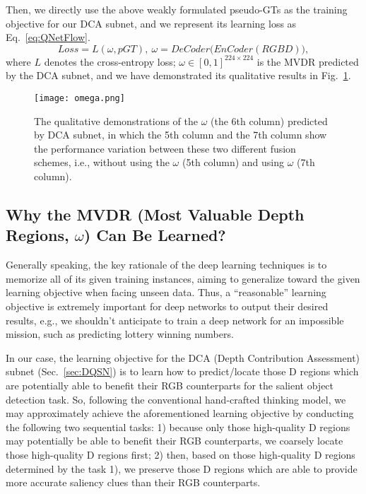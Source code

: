 \documentclass[journal]{IEEEtran}
\begin{document}
Then, we directly use the above weakly formulated pseudo-GTs as the training objective for our DCA subnet, and we represent its learning loss as Eq.~\ref{eq:QNetFlow}.
\begin{equation}
\label{eq:QNetFlow}
Loss = L(\omega, pGT),\  \omega = DeCoder\big(EnCoder(RGBD)\big),
\end{equation}
where $L$ denotes the cross-entropy loss; $\omega\in[0,1]^{224\times 224}$ is the MVDR predicted by the DCA subnet, and we have demonstrated its qualitative results in Fig.~\ref{fig:omega}.


\begin{figure}[t]
\centering
\texttt{[image: omega.png]} \caption{The qualitative demonstrations of the $\omega$ (the 6th column) predicted by DCA subnet, in which the 5th column and the 7th column show the performance variation between these two different fusion schemes, i.e., without using the $\omega$ (5th column) and using $\omega$ (7th column).}
\label{fig:omega}
\end{figure}


\subsection{Why the MVDR (Most Valuable Depth Regions, $\omega$) Can Be Learned?}
Generally speaking, the key rationale of the deep learning techniques is to memorize all of its given training instances, aiming to generalize toward the given learning objective when facing unseen data.
Thus, a ``reasonable'' learning objective is extremely important for deep networks to output their desired results, e.g., we shouldn't anticipate to train a deep network for an impossible mission, such as predicting lottery winning numbers.

In our case, the learning objective for the DCA (Depth Contribution Assessment) subnet (Sec.~\ref{sec:DQSN}) is to learn how to predict/locate those D regions which are potentially able to benefit their RGB counterparts for the salient object detection task.
So, following the conventional hand-crafted thinking model, we may approximately achieve the aforementioned learning objective by conducting the following two sequential tasks:
1) because only those high-quality D regions may potentially be able to benefit their RGB counterparts, we coarsely locate those high-quality D regions first;
2) then, based on those high-quality D regions determined by the task 1), we preserve those D regions which are able to provide more accurate saliency clues than their RGB counterparts.
\end{document}
